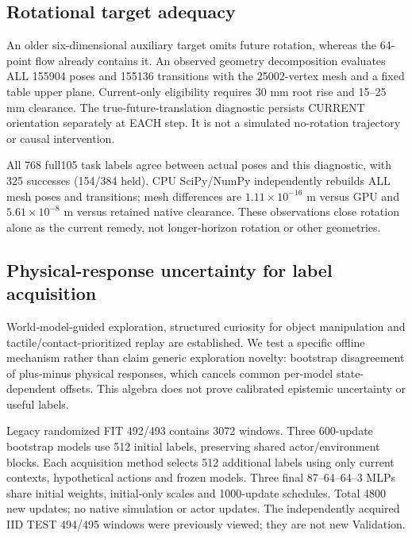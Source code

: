 \documentclass[10pt]{article}
\begin{document}
\clearpage
\subsection{Rotational target adequacy}
An older six-dimensional auxiliary target omits future rotation, whereas the 64-point flow
already contains it. An observed geometry decomposition evaluates ALL 155904
poses and 155136 transitions with the 25002-vertex mesh and a fixed table upper
plane. Current-only eligibility requires 30 mm root rise and 15--25 mm clearance.
The true-future-translation diagnostic persists CURRENT orientation separately
at EACH step. It is not a simulated no-rotation trajectory or causal intervention.
\begin{table}[ht]\centering\small

\caption{Equal-episode decision flips and weighted 95 th absolute rotational
clearance contribution. Held coverage and 2 mm magnitude gates pass;10\%flip
gate fails. Motion 0 has no eligible windows, so it was not assessed.}
\end{table}
All 768 full105 task labels agree between actual poses and this diagnostic,
with 325 successes (154/384 held). CPU SciPy/NumPy independently rebuilds ALL
mesh poses and transitions; mesh differences are $1.11\times10^{-16}$ m versus GPU and
$5.61\times10^{-8}$ m versus retained native clearance. These observations close rotation
alone as the current remedy, not longer-horizon rotation or other geometries.

\clearpage
\subsection{Physical-response uncertainty for label acquisition}
World-model-guided exploration\cite{sekar2020}, structured curiosity for object
manipulation\cite{sancaktar2022} and tactile/contact-prioritized replay
\cite{vulin2021} are established. We test a specific offline mechanism rather
than claim generic exploration novelty: bootstrap disagreement of plus-minus
physical responses, which cancels common per-model state-dependent offsets.
This algebra does not prove calibrated epistemic uncertainty or useful labels.

Legacy randomized FIT 492/493 contains 3072 windows. Three 600-update bootstrap
models use 512 initial labels, preserving shared actor/environment blocks. Each
acquisition method selects 512 additional labels using only current contexts,
hypothetical actions and frozen models. Three final 87--64--64--3 MLPs share
initial weights, initial-only scales and 1000-update schedules. Total 4800 new
updates; no native simulation or actor updates. The independently acquired
IID TEST 494/495 windows were previously viewed; they are not new Validation.
\end{document}
